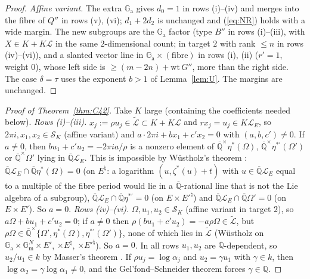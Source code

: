 \documentclass[11pt]{amsart}
\theoremstyle{definition}
\newcommand{\Qb}{\overline{\mathbb{Q}}}
\newcommand{\Q}{\mathbb{Q}}
\newcommand{\Ga}{\mathbb{G}_{\mathrm a}}
\newcommand{\Gm}{\mathbb{G}_{\mathrm m}}
\newcommand{\Lg}{\mathcal{L}}
\newcommand{\Lt}{\widetilde{\mathcal{L}}}
\begin{document}
\begin{proof}
\emph{Affine variant.} The extra $\Ga$ gives $d_0=1$ in rows (i)--(iv) and merges into the fibre of $Q''$ in rows (v), (vi);
$d_1+2d_2$ is unchanged and (\ref{eq:NR}) holds with a wide margin. The new subgroups are the $\Ga$ factor (type $B''$ in
rows (i)--(iii), with $X\in K+K\Lg$ in the same $2$-dimensional count; in target $2$ with rank $\le n$ in rows (iv)--(vi)), and
a slanted vector line in $\Ga\times(\text{fibre})$ in rows (i), (ii) ($r'=1$, weight $0$), whose left side is
$\ge(m-2n)+\mathrm{wt}\,G''$, more than the right side. The case $\delta=\tau$ uses the exponent $b>1$ of Lemma~\ref{lem:U}.
The margins are unchanged.
\end{proof}

\begin{proof}[Proof of Theorem~\ref{thm:C42}]
Take $K$ large (containing the coefficients needed below). \emph{Rows (i)--(iii).} $x_j:=\rho u_j\in\Lt\subset K+K\Lg$ and
$rx_j=u_j\in K\Lg_E$, so $2\pi i,x_1,x_2\in\mathcal S_K$ (affine variant) and $a\cdot2\pi i+bx_1+c'x_2=0$ with $(a,b,c')\ne0$.
If $a\ne0$, then $bu_1+c'u_2=-2\pi ia/\rho$ is a nonzero element of $\Qb^\times\eta^*(\Omega)$, $\Qb^\times\eta^{*\prime}(\Omega')$
or $\Qb^\times\Omega'$ lying in $\Qb\Lg_E$. This is impossible by W\"ustholz's theorem \cite{Wu89}: $\Qb\Lg_E\cap\Qb\eta^*(\Omega)=0$
(on $E^\natural$: a logarithm $(u,\zeta^*(u)+t)$ with $u\in\Qb\Lg_E$ equal to a multiple of the fibre period would lie in a
$\Qb$-rational line that is not the Lie algebra of a subgroup), $\Qb\Lg_E\cap\Qb\eta^{*\prime}=0$ (on $E\times E'^\natural$) and
$\Qb\Lg_E\cap\Qb\Omega'=0$ (on $E\times E'$). So $a=0$. \emph{Rows (iv)--(vi).} $\Omega,u_1,u_2\in\mathcal S_K$ (affine variant
in target $2$), so $a\Omega+bu_1+c'u_2=0$; if $a\ne0$ then $\rho(bu_1+c'u_2)=-a\rho\Omega\in\Lt$, but
$\rho\Omega\in\Qb^\times\{\Omega',\eta^*(\Omega),\eta^{*\prime}(\Omega')\}$, none of which lies in $\Lt$ (W\"ustholz on
$\Ga\times\Gm^N\times E'$, $\times E^\natural$, $\times E'^\natural$). So $a=0$. In all rows $u_1,u_2$ are $\Qb$-dependent, so
$u_2/u_1\in k$ by Masser's theorem \cite{Ma75}. If $\rho u_j=\log\alpha_j$ and $u_2=\gamma u_1$ with $\gamma\in k$, then
$\log\alpha_2=\gamma\log\alpha_1\ne0$, and the Gel'fond--Schneider theorem forces $\gamma\in\Q$.
\end{proof}
\end{document}
